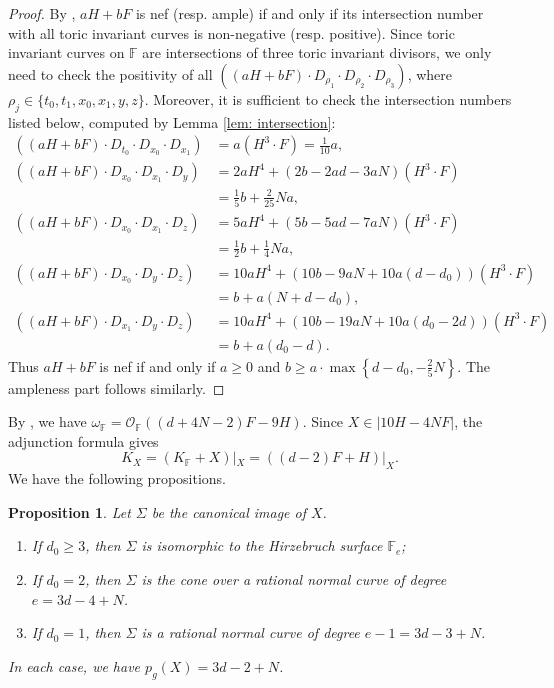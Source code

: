 \documentclass[a4paper,11pt]{amsart}
\newcommand{\FF}{\ensuremath{\mathbb{F}}}
\newtheorem{prop}[thm]{Proposition}
\theoremstyle{definition}
\theoremstyle{remark}
\numberwithin{equation}{section}
\begin{document}
\begin{proof}
	By \cite[Theorem 6.3.12 and 6.3.13]{CLS}, $aH + bF$ is nef (resp. ample) if and only if its intersection number with all toric invariant curves is non-negative (resp. positive). Since toric invariant curves on $\mathbb{F}$ are intersections of three toric invariant divisors, we only need to check the positivity of all $\left((aH + bF) \cdot D_{\rho_1} \cdot D_{\rho_2} \cdot D_{\rho_3}\right)$, where $\rho_j \in \{t_0, t_1, x_0, x_1, y, z\}$. Moreover, it is sufficient to check the intersection numbers listed below, computed by Lemma \ref{lem: intersection}: 
	\begin{align*}
		\left((aH + bF) \cdot D_{t_0} \cdot D_{x_0} \cdot D_{x_1}\right) & = a (H^3 \cdot F) = \frac{1}{10} a, \\
		\left((aH + bF) \cdot D_{x_0} \cdot D_{x_1} \cdot D_y\right) & = 2a H^4 + (2b - 2ad - 3aN) (H^3 \cdot F) \\ 
		& = \frac15 b + \frac2{25} Na, \\
		\left((aH + bF) \cdot D_{x_0} \cdot D_{x_1} \cdot D_z\right) & = 5a H^4 + (5b - 5ad - 7aN) (H^3 \cdot F) \\
		& = \frac12 b + \frac 14 Na, \\
		\left((aH + bF) \cdot D_{x_0} \cdot D_y \cdot D_z\right) & = 10aH^4 + \left(10b - 9aN + 10a(d-d_0) \right) (H^3 \cdot F) \\
		& = b + a(N + d - d_0), \\
		\left((aH + bF) \cdot D_{x_1} \cdot D_y \cdot D_z\right) & = 10aH^4 + \left(10b - 19aN + 10a(d_0 - 2d) \right) (H^3 \cdot F) \\
		& = b + a(d_0 - d).
	\end{align*}
	Thus $aH + bF$ is nef if and only if $a \ge 0$ and $b \ge a \cdot \max \left\{d-d_0, -\frac25N \right\}$. The ampleness part follows similarly.
\end{proof}

By \cite[Proposition 1.1]{CP}, we have $\omega_{\FF} = \mathcal{O}_{\mathbb{F}}\left( (d+4N-2)F-9H \right)$. Since $X \in |10H - 4NF|$, the adjunction formula gives 
$$
K_X = (K_{\mathbb{F}}+X)|_X = \left((d - 2)F + H\right)|_X.
$$
We have the following propositions.

\begin{prop} \label{prop: canonical image}
	Let $\Sigma$ be the canonical image of $X$.
	\begin{enumerate}
		\item If $d_0 \ge 3$, then $\Sigma$ is isomorphic to the Hirzebruch surface $\mathbb{F}_e$;
		\item If $d_0 = 2$, then $\Sigma$ is the cone over a rational normal curve of degree $e = 3d - 4 + N$.
		\item If $d_0 = 1$, then $\Sigma$ is a rational normal curve of degree $e - 1 = 3d - 3 + N$.
	\end{enumerate}
	In each case, we have $p_g(X) = 3d - 2 + N$.
\end{prop}
\end{document}
